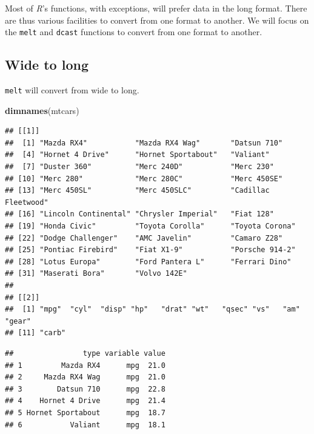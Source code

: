 \documentclass[]{book}
\newenvironment{Shaded}{\begin{snugshade}}{\end{snugshade}}
\newcommand{\DataTypeTok}[1]{\textcolor[rgb]{0.13,0.29,0.53}{#1}}
\newcommand{\KeywordTok}[1]{\textcolor[rgb]{0.13,0.29,0.53}{\textbf{#1}}}
\newcommand{\NormalTok}[1]{#1}
\newcommand{\OperatorTok}[1]{\textcolor[rgb]{0.81,0.36,0.00}{\textbf{#1}}}
\newcommand{\StringTok}[1]{\textcolor[rgb]{0.31,0.60,0.02}{#1}}
\theoremstyle{definition}
\theoremstyle{definition}
\theoremstyle{definition}
\theoremstyle{remark}
\begin{document}
Most of \emph{R}'s functions, with exceptions, will prefer data in the long format.
There are thus various facilities to convert from one format to another.
We will focus on the \texttt{melt} and \texttt{dcast} functions to convert from one format to another.

\hypertarget{wide-to-long}{%
\subsection{Wide to long}\label{wide-to-long}}

\texttt{melt} will convert from wide to long.

\begin{Shaded}
\begin{Highlighting}[]
\KeywordTok{dimnames}\NormalTok{(mtcars)}
\end{Highlighting}
\end{Shaded}

\begin{verbatim}
## [[1]]
##  [1] "Mazda RX4"           "Mazda RX4 Wag"       "Datsun 710"         
##  [4] "Hornet 4 Drive"      "Hornet Sportabout"   "Valiant"            
##  [7] "Duster 360"          "Merc 240D"           "Merc 230"           
## [10] "Merc 280"            "Merc 280C"           "Merc 450SE"         
## [13] "Merc 450SL"          "Merc 450SLC"         "Cadillac Fleetwood" 
## [16] "Lincoln Continental" "Chrysler Imperial"   "Fiat 128"           
## [19] "Honda Civic"         "Toyota Corolla"      "Toyota Corona"      
## [22] "Dodge Challenger"    "AMC Javelin"         "Camaro Z28"         
## [25] "Pontiac Firebird"    "Fiat X1-9"           "Porsche 914-2"      
## [28] "Lotus Europa"        "Ford Pantera L"      "Ferrari Dino"       
## [31] "Maserati Bora"       "Volvo 142E"         
## 
## [[2]]
##  [1] "mpg"  "cyl"  "disp" "hp"   "drat" "wt"   "qsec" "vs"   "am"   "gear"
## [11] "carb"
\end{verbatim}

\begin{Shaded}
\end{Shaded}

\begin{verbatim}
##                type variable value
## 1         Mazda RX4      mpg  21.0
## 2     Mazda RX4 Wag      mpg  21.0
## 3        Datsun 710      mpg  22.8
## 4    Hornet 4 Drive      mpg  21.4
## 5 Hornet Sportabout      mpg  18.7
## 6           Valiant      mpg  18.1
\end{verbatim}
\end{document}

